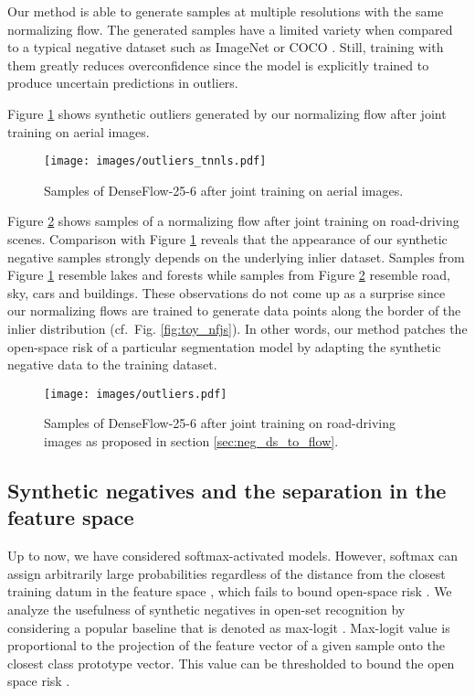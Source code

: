 \documentclass[lettersize,journal,hidelinks]{IEEEtran}
\begin{document}
Our method is able to generate samples at multiple resolutions with the same normalizing flow.
The generated samples have a limited variety when compared to a typical negative dataset such as ImageNet or COCO \cite{bevandic19gcpr,chan21iccv}.
Still, training with them greatly reduces overconfidence
 since the model is explicitly trained to produce uncertain predictions in outliers.

Figure \ref{fig:outliers-bsb} shows synthetic outliers generated by our normalizing flow after joint training on aerial images.
\begin{figure}[ht]
    \centering
    \texttt{[image: images/outliers\_tnnls.pdf]}
    \caption{
    Samples of DenseFlow-25-6 after joint training on aerial images.
    }
    \label{fig:outliers-bsb}
\end{figure}

Figure \ref{fig:outliers-smiyc} shows samples of a normalizing flow after joint training on road-driving scenes.
Comparison with Figure \ref{fig:outliers-bsb} reveals that the appearance of our synthetic negative samples
strongly depends on the underlying inlier dataset.
Samples from Figure \ref{fig:outliers-bsb} resemble lakes and forests
while samples from Figure \ref{fig:outliers-smiyc} resemble 
road, sky, cars and buildings.
These observations do not come up as a surprise
since our normalizing flows are trained
to generate data points along the border
of the inlier distribution (cf.\ Fig. \ref{fig:toy_nfjs}).
In other words, our method patches the open-space risk 
of a particular segmentation model
by adapting the synthetic negative data
to the training dataset.
\begin{figure}[ht]
    \centering
    \texttt{[image: images/outliers.pdf]}
    \caption{
    Samples of DenseFlow-25-6 after joint training on road-driving images as proposed in section \ref{sec:neg_ds_to_flow}.
    }
    \label{fig:outliers-smiyc}
\end{figure}




\subsection{Synthetic negatives and the separation in the feature space}

Up to now, we have considered softmax-activated models.
However, softmax can assign arbitrarily large probabilities regardless of the distance from the closest training datum in the feature space \cite{scheirer14tpami}, which fails to bound open-space risk \cite{scheirer12tpami,boult19aaai}.
We analyze the usefulness of synthetic negatives in open-set recognition by considering a popular baseline that is denoted as max-logit \cite{hendrycks19arxiv,vaze22iclr,chen22tpami}.
Max-logit value is proportional to  the projection of the feature vector of a given sample onto the closest class prototype vector.
This value can be thresholded to bound the open space risk \cite{boult19aaai,stefano00tsmc}.
\end{document}
